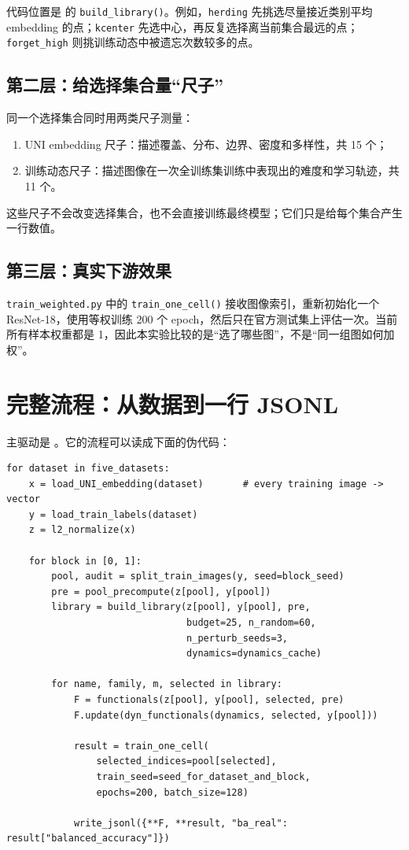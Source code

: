 \documentclass[UTF8,a4paper,12pt]{ctexart}
\newcommand{\code}[1]{\texttt{#1}}
\begin{document}
代码位置是  的 \code{build_library()}。例如，\code{herding} 先挑选尽量接近类别平均 embedding 的点；\code{kcenter} 先选中心，再反复选择离当前集合最远的点；\code{forget\_high} 则挑训练动态中被遗忘次数较多的点。

\subsection{第二层：给选择集合量“尺子”}

同一个选择集合同时用两类尺子测量：

\begin{enumerate}
  \item UNI embedding 尺子：描述覆盖、分布、边界、密度和多样性，共 15 个；
  \item 训练动态尺子：描述图像在一次全训练集训练中表现出的难度和学习轨迹，共 11 个。
\end{enumerate}

这些尺子不会改变选择集合，也不会直接训练最终模型；它们只是给每个集合产生一行数值。

\subsection{第三层：真实下游效果}

\code{train\_weighted.py} 中的 \code{train\_one\_cell()} 接收图像索引，重新初始化一个 ResNet-18，使用等权训练 200 个 epoch，然后只在官方测试集上评估一次。当前所有样本权重都是 1，因此本实验比较的是“选了哪些图”，不是“同一组图如何加权”。

\section{完整流程：从数据到一行 JSONL}

主驱动是 。它的流程可以读成下面的伪代码：

\begin{lstlisting}
for dataset in five_datasets:
    x = load_UNI_embedding(dataset)       # every training image -> vector
    y = load_train_labels(dataset)
    z = l2_normalize(x)

    for block in [0, 1]:
        pool, audit = split_train_images(y, seed=block_seed)
        pre = pool_precompute(z[pool], y[pool])
        library = build_library(z[pool], y[pool], pre,
                                budget=25, n_random=60,
                                n_perturb_seeds=3,
                                dynamics=dynamics_cache)

        for name, family, m, selected in library:
            F = functionals(z[pool], y[pool], selected, pre)
            F.update(dyn_functionals(dynamics, selected, y[pool]))

            result = train_one_cell(
                selected_indices=pool[selected],
                train_seed=seed_for_dataset_and_block,
                epochs=200, batch_size=128)

            write_jsonl({**F, **result, "ba_real": result["balanced_accuracy"]})
\end{lstlisting}
\end{document}
